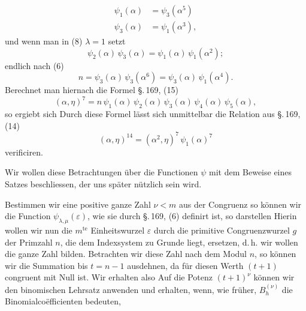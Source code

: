 
\[
\begin{aligned}
\psi_1(\alpha) &= \psi_3(\alpha^5)\\
\psi_3(\alpha) &= \psi_1(\alpha^3),
\end{aligned}
\]
und wenn man in (8) $\lambda = 1$ setzt
\[
\psi_2(\alpha)\,\psi_3(\alpha) = \psi_1(\alpha)\,\psi_1(\alpha^2);
\]
endlich nach (6)
\[
n = \psi_3(\alpha)\,\psi_3(\alpha^6) = \psi_3(\alpha)\,\psi_1(\alpha^4).
\]
Berechnet man hiernach die Formel \S.\,169, (15)
\[
(\alpha, \eta)^7 = n\,\psi_1(\alpha)\,\psi_2(\alpha)\,\psi_3(\alpha)\,\psi_4(\alpha)\,\psi_5(\alpha),
\]
so ergiebt sich
Durch diese Formel l\"asst sich unmittelbar die Relation aus \S.\,169, (14)
\[
(\alpha, \eta)^{14} = (\alpha^2, \eta)^7\,\psi_1(\alpha)^7
\]
verificiren.

Wir wollen diese Betrachtungen \"uber die Functionen $\psi$ mit dem Beweise eines Satzes beschliessen, der uns sp\"ater n\"utzlich sein wird.

Bestimmen wir eine positive ganze Zahl $\nu < m$ aus der Congruenz
so k\"onnen wir die Function $\psi_{\lambda,\mu}(\varepsilon)$, wie sie durch \S.\,169, (6) definirt ist, so darstellen
Hierin wollen wir nun die $m^{\text{te}}$ Einheitswurzel $\varepsilon$ durch die primitive Congruenzwurzel $g$ der Primzahl $n$, die dem Indexsystem zu Grunde liegt, ersetzen, d.\,h. wir wollen die ganze Zahl
bilden. Betrachten wir diese Zahl nach dem Modul $n$, so k\"onnen wir die Summation bis $t = n - 1$ ausdehnen, da f\"ur diesen Werth $(t + 1)$ congruent mit Null ist. Wir erhalten also
Auf die Potenz $(t + 1)^\nu$ k\"onnen wir den binomischen Lehrsatz anwenden und erhalten, wenn, wie fr\"uher, $B_h^{(\nu)}$ die Binomialco\"efficienten bedeuten,
